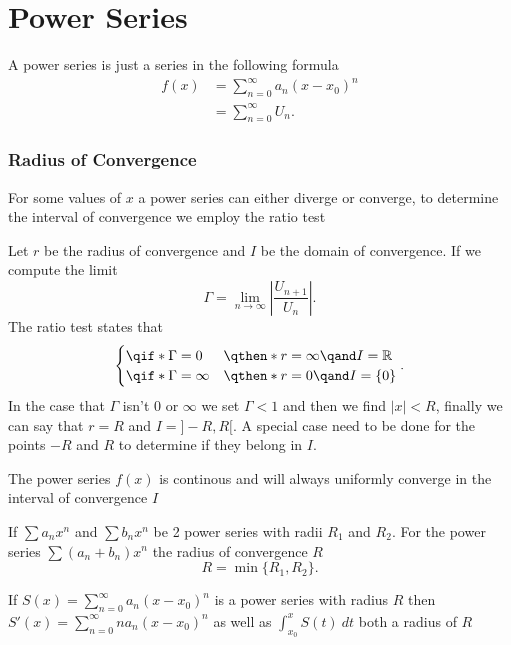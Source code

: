 \part{Power Series}

A power series is just a series in the following formula
\begin{align*}
	f(x) & =\sum_{n=0}^{\infty} a_n(x-x_0)^n \\
	     & =\sum_{n=0}^{\infty} U_n
	.\end{align*}

\section{Radius of Convergence}

For some values of $x$ a power series can either diverge or converge, to determine the interval of convergence we employ the ratio test

\begin{theorem}
	Let $r$ be the radius of convergence and $I$ be the domain of convergence. If we compute the limit
	\[
		\Gamma = \lim_{n \to \infty}\left| \frac{U_{n+1}}{U_n} \right|
		.\]
	The ratio test states that
	\[
		\begin{cases}
			\qif* \Gamma = 0      & \qthen* r=\infty\qand I=\mathbb{R} \\
			\qif* \Gamma = \infty & \qthen* r=0\qand I=\{0\}           \\
		\end{cases}
		.\]
	In the case that $\Gamma$ isn't 0 or $\infty$ we set $\Gamma<1$ and then we find $|x|<R$, finally we can say that $r=R$ and $I=]-R,R[$. A special case need to be done for the points  $-R$ and $R$ to determine if they belong in  $I$.
\end{theorem}

\begin{remark}
	The power series $f(x)$ is continous and will always uniformly converge in the interval of convergence $I$
\end{remark}

\begin{theorem}

	If $\sum a_n x^n$ and $\sum b_n x^n$ be 2 power series with radii  $R_1$ and $R_2$. For the power series $\sum (a_n+b_n)x^n$ the radius of convergence $R$
	\[
		R=\min \{R_1,R_2\}
		.\]
\end{theorem}


\begin{theorem}
	If $S(x)=\sum_{n=0}^{\infty} a_n(x-x_0)^n$ is a power series with radius $R$ then $S'(x)=\sum_{n=0}^{\infty} na_n(x-x_0)^n$ as well as $\int_{{x_0}}^{{x}} {S(t)} \: d{t}$ both a radius of $R$
\end{theorem}

